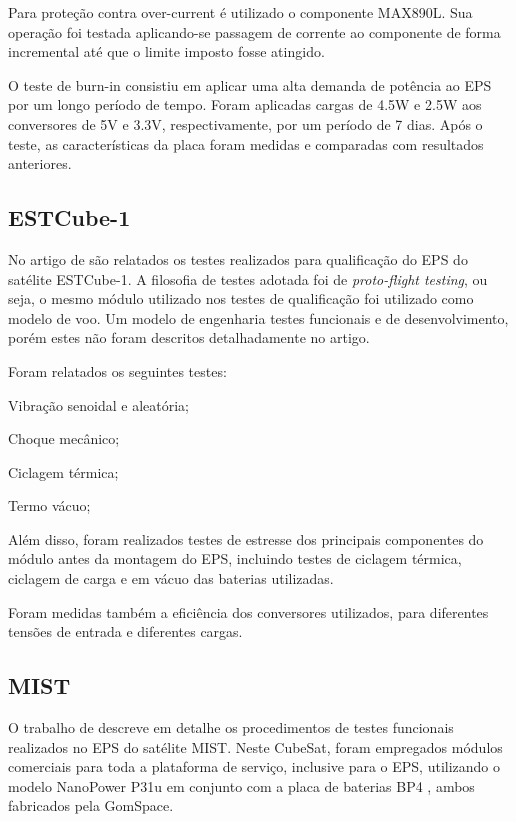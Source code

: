 Para proteção contra over-current é utilizado o componente MAX890L. Sua operação foi testada aplicando-se passagem de corrente ao componente de forma incremental até que o limite imposto fosse atingido.

O teste de burn-in consistiu em aplicar uma alta demanda de potência ao EPS por um longo período de tempo.
Foram aplicadas cargas de 4.5W e 2.5W aos conversores de 5V e 3.3V, respectivamente, por um período de 7 dias. Após o teste, as características da placa foram medidas e comparadas com resultados anteriores.

\subsection{ESTCube-1}

No artigo de \textcite{estcube-eps} são relatados os testes realizados para qualificação do \gls{EPS} do satélite ESTCube-1. A filosofia de testes adotada foi de \textit{proto-flight testing}, ou seja, o mesmo módulo utilizado nos testes de qualificação foi utilizado como modelo de voo.
Um modelo de engenharia testes funcionais e de desenvolvimento, porém estes não foram descritos detalhadamente no artigo.

Foram relatados os seguintes testes:
\begin{alineas}
    \item Vibração senoidal e aleatória;
    \item Choque mecânico;
    \item Ciclagem térmica;
    \item Termo vácuo;
\end{alineas}

Além disso, foram realizados testes de estresse dos principais componentes do módulo antes da montagem do \gls{EPS}, incluindo testes de ciclagem térmica, ciclagem de carga e em vácuo das baterias utilizadas.

Foram medidas também a eficiência dos conversores utilizados, para diferentes tensões de entrada e diferentes cargas.


\subsection{MIST}

O trabalho de \textcite{mist-eps} descreve em detalhe os procedimentos de testes funcionais realizados no \gls{EPS} do satélite MIST.
Neste CubeSat, foram empregados módulos comerciais para toda a plataforma de serviço, inclusive para o \gls{EPS}, utilizando o modelo NanoPower P31u \cite{p31u-datasheet} em conjunto com a placa de baterias BP4 \cite{bp4-datasheet}, ambos fabricados pela GomSpace.

